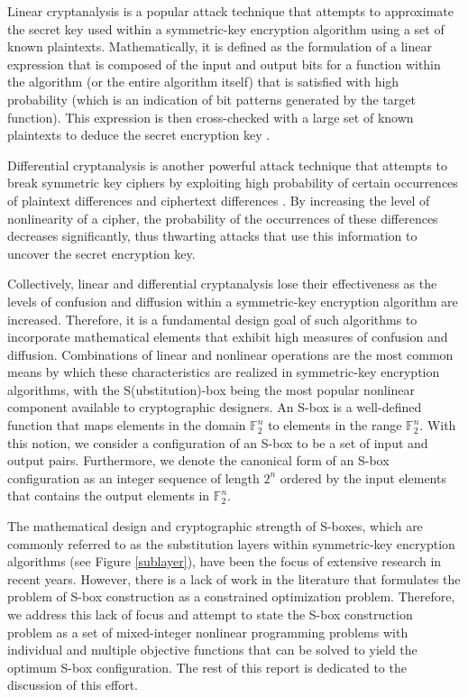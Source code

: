 \documentclass[11pt]{article}
\newcommand{\field}[1]{\mathbb{#1}} %
\begin{document}
Linear cryptanalysis is a popular attack technique that attempts to approximate the secret key used within a symmetric-key encryption algorithm using a set of known plaintexts. Mathematically, it is defined as the formulation of a linear expression that is composed of the input and output bits for a function within the algorithm (or the entire algorithm itself) that is satisfied with high probability (which is an indication of bit patterns generated by the target function). This expression is then cross-checked with a large set of known plaintexts to deduce the secret encryption key \cite{Heys01atutorial}.

Differential cryptanalysis is another powerful attack technique that attempts to break symmetric key ciphers by exploiting high probability of certain occurrences of plaintext differences and ciphertext differences \cite{Heys01atutorial}. By increasing the level of nonlinearity of a cipher, the probability of the occurrences of these differences decreases significantly, thus thwarting attacks that use this information to uncover the secret encryption key. 

Collectively, linear and differential cryptanalysis lose their effectiveness as the levels of confusion and diffusion within a symmetric-key encryption algorithm are increased. Therefore, it is a fundamental design goal of such algorithms to incorporate mathematical elements that exhibit high measures of confusion and diffusion. Combinations of linear and nonlinear operations are the most common means by which these characteristics are realized in symmetric-key encryption algorithms, with the S(ubstitution)-box being the most popular nonlinear component available to cryptographic designers. An S-box is a well-defined function that maps elements in the domain $\field{F}_2^n$ to elements in the range $\field{F}_2^n$. With this notion, we consider a configuration of an S-box to be a set of input and output pairs. Furthermore, we denote the canonical form of an S-box configuration as an integer sequence of length $2^n$ ordered by the input elements that contains the output elements in $\field{F}_2^n$.

The mathematical design and cryptographic strength of S-boxes, which are commonly referred to as the substitution layers within symmetric-key encryption algorithms (see Figure \ref{sublayer}), have been the focus of extensive research in recent years. However, there is a lack of work in the literature that formulates the problem of S-box construction as a constrained optimization problem. Therefore, we address this lack of focus and attempt to state the S-box construction problem as a set of mixed-integer nonlinear programming problems with individual and multiple objective functions that can be solved to yield the optimum S-box configuration. The rest of this report is dedicated to the discussion of this effort.
\end{document}
